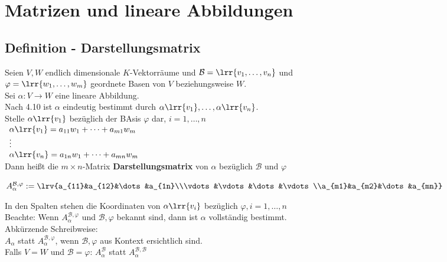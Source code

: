 \newpage
\section{Matrizen und lineare Abbildungen}
\subsection{Definition - Darstellungsmatrix}
	Seien $V,W$ endlich dimensionale $K$-Vektorräume und $\mathcal{B}=\lrr{v_1,\dots,v_n}$ und\\
	$\varphi=\lrr{w_1,\dots,w_m}$ geordnete Basen von $V$ beziehungsweise $W$.\\
	Sei $\alpha: V\rightarrow W$ eine lineare Abbildung.\\
	Nach 4.10 ist $\alpha$ eindeutig bestimmt durch $\alpha\lrr{v_1},\dots,\alpha\lrr{v_n}$.\\
	Stelle $\alpha\lrr{v_1}$ bezüglich der BAsis $\varphi$ dar, $i=1,\dots,n$\\
	$\begin{array}{l}
		\alpha\lrr{v_1}=a_{11}w_1+\dots+a_{m1}w_m\\
		\vdots\\
		\alpha\lrr{v_n}=a_{1n}w_1+\dots+a_{mn}w_m
	\end{array}$\\
	Dann heißt die $m\times n$-Matrix \textbf{Darstellungsmatrix} von $\alpha$ bezüglich $\mathcal{B}$ und $\varphi$
	
	$A_{\alpha}^{\mathcal{B}, \varphi}:=\lrv{a_{11}&a_{12}&\dots&a_{1n}\\\vdots&\vdots&\dots&\vdots\\a_{m1}&a_{m2}&\dots&a_{mn}}$
	
	In den Spalten stehen die Koordinaten von $\alpha\lrr{v_i}$ bezüglich $\varphi, i=1,\dots,n$\\
	Beachte: Wenn $A_{\alpha}^{\mathcal{B}, \varphi}$ und $\mathcal{B},\varphi$ bekannt sind, dann ist $\alpha$ vollständig bestimmt.\\
	Abkürzende Schreibweise:\\
	$A_\alpha$ statt $A_{\alpha}^{\mathcal{B}, \varphi}$, wenn $\mathcal{B},\varphi$ aus Kontext ersichtlich sind.\\
	Falls $V=W$ und $\mathcal{B}=\varphi$: $A_{\alpha}^{\mathcal{B}}$ statt $A_{\alpha}^{\mathcal{B}, \mathcal{B}}$
	
